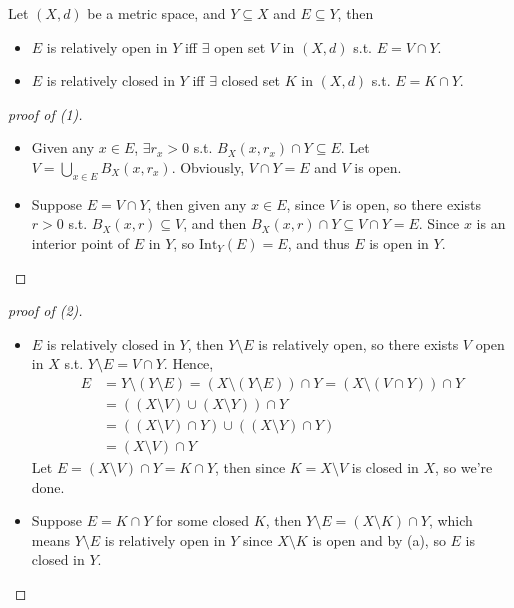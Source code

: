 \begin{proposition}
    Let \((X, d)\) be a metric space, and \(Y \subseteq X\) and \(E \subseteq Y\), then 
    \begin{itemize}
        \item [(1)] \(E\) is relatively open in \(Y\) iff \(\exists \) open set \(V\) in \((X, d)\) s.t. \(E = V \cap Y\).      
        \item [(2)] \(E\) is relatively closed in \(Y\) iff \(\exists \) closed set \(K\) in \((X, d)\) s.t. \(E = K \cap Y\).     
    \end{itemize}   
\end{proposition}
\begin{proof}[proof of (1)]
    \vphantom{text}
    \begin{itemize}
        \item [\((\implies )\)] Given any \(x \in E\), \(\exists r_x > 0\) s.t. \(B_X(x, r_x) \cap Y \subseteq E\). Let \(V = \bigcup_{x \in E} B_X(x, r_x) \). Obviously, \(V \cap Y = E\) and \(V\) is open.    
        \item [\((\impliedby )\)] Suppose \(E = V \cap Y\), then given any \(x \in E\), since \(V\) is open, so there exists \(r > 0\) s.t. \(B_X(x, r) \subseteq V\), and then \(B_X(x, r) \cap Y \subseteq V \cap Y = E\). Since \(x\) is an interior point of \(E\) in \(Y\), so \(\mathrm{Int}_Y(E) = E\), and thus \(E\) is open in \(Y\).             
    \end{itemize}
\end{proof}
\begin{proof}[proof of (2)]
    \vphantom{text}
    \begin{itemize}
        \item [\((\implies )\)] \(E\) is relatively closed in \(Y\), then \(Y \setminus E\) is relatively open, so there exists \(V\) open in \(X\) s.t. \(Y \setminus E = V \cap Y\). Hence,
        \begin{align*}
            E &= Y \setminus (Y \setminus E) = (X \setminus (Y \setminus E)) \cap Y = \left( X \setminus (V \cap Y) \right) \cap Y \\
            &= \left( (X \setminus V) \cup (X \setminus Y) \right) \cap Y \\
            &= ((X \setminus V) \cap Y ) \cup ((X \setminus Y) \cap Y) \\
            &= (X \setminus V) \cap Y
        \end{align*}
        Let \(E = (X \setminus V) \cap Y = K \cap Y\), then since \(K = X \setminus V\) is closed in \(X\), so we're done.   
        \item [\((\impliedby )\)] Suppose \(E = K \cap Y\) for some closed \(K\), then \(Y \setminus E = (X \setminus K) \cap Y\), which means \(Y \setminus E\) is relatively open in \(Y\) since \(X \setminus K\) is open and by (a), so \(E\) is closed in \(Y\).        
    \end{itemize}
\end{proof}

